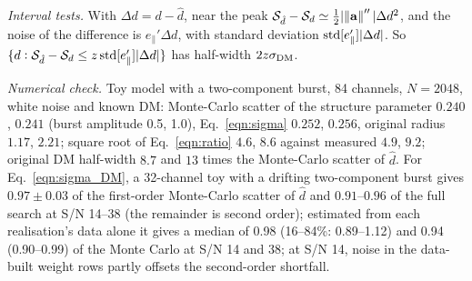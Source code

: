 \documentclass[twocolumn]{aastex631}
\begin{document}
\textit{Interval tests.} With $\Delta d=d-\hat d$, near the peak $\mathcal{S}_{\hat d}-\mathcal{S}_d\simeq\tfrac12|\norm{\mathbf{a}}''|\Delta d^2$, and the noise of the difference is $e_\parallel'\Delta d$, with standard deviation ${\rm std}[e_\parallel']|\Delta d|$. So $\{d:\mathcal{S}_{\hat d}-\mathcal{S}_d\le z\,{\rm std}[e_\parallel']|\Delta d|\}$ has half-width $2z\sigma_{\rm DM}$.

\textit{Numerical check.} Toy model with a two-component burst, 84 channels, $N=2048$, white noise and known DM: Monte-Carlo scatter of the structure parameter $0.240$, $0.241$ (burst amplitude 0.5, 1.0), Eq.~\eqref{eqn:sigma} $0.252$, $0.256$, original radius $1.17$, $2.21$; square root of Eq.~\eqref{eqn:ratio} $4.6$, $8.6$ against measured $4.9$, $9.2$; original DM half-width $8.7$ and $13$ times the Monte-Carlo scatter of $\hat d$. For Eq.~\eqref{eqn:sigma_DM}, a 32-channel toy with a drifting two-component burst gives $0.97\pm0.03$ of the first-order Monte-Carlo scatter of $\hat d$ and $0.91$--$0.96$ of the full search at S/N 14--38 (the remainder is second order); estimated from each realisation's data alone it gives a median of 0.98 (16--84\%: 0.89--1.12) and 0.94 (0.90--0.99) of the Monte Carlo at S/N 14 and 38; at S/N 14, noise in the data-built weight rows partly offsets the second-order shortfall.

%

\end{document}
